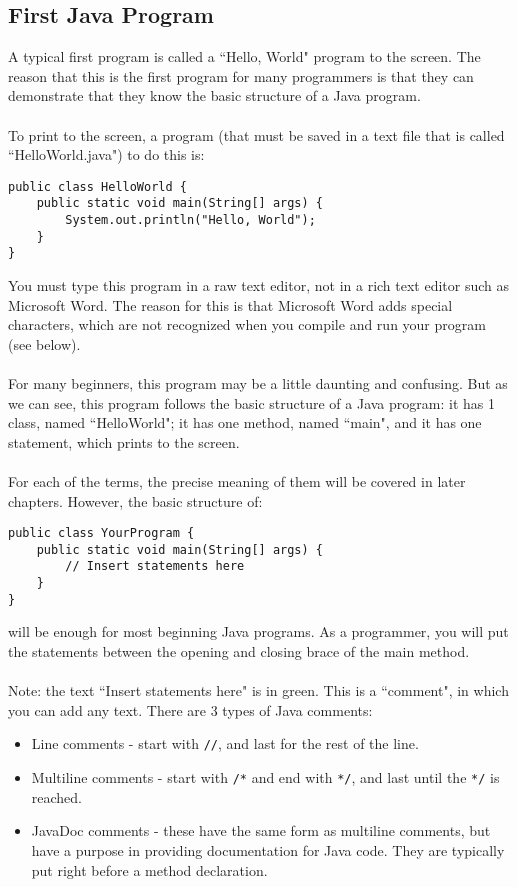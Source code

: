 \subsection{First Java Program}
A typical first program is called a ``Hello, World" program to the screen. The reason that this is the first program for many programmers is that they can demonstrate that they know the basic structure of a Java program. 
\\ \\
To print to the screen, a program (that must be saved in a text file that is called ``HelloWorld.java") to do this is:
\begin{lstlisting}
public class HelloWorld {
	public static void main(String[] args) {
		System.out.println("Hello, World");
	}
}
\end{lstlisting}
You must type this program in a raw text editor, not in a rich text editor such as Microsoft Word. The reason for this is that Microsoft Word adds special characters, which are not recognized when you compile and run your program (see below).
\\ \\
For many beginners, this program may be a little daunting and confusing. But as we can see, this program follows the basic structure of a Java program: it has 1 class, named ``HelloWorld"; it has one method, named ``main", and it has one statement, which prints to the screen. 
\\ \\
For each of the terms, the precise meaning of them will be covered in later chapters. However, the basic structure of:
\begin{lstlisting}
public class YourProgram {
	public static void main(String[] args) {
		// Insert statements here
	}
}
\end{lstlisting}
will be enough for most beginning Java programs. As a programmer, you will put the statements between the opening and closing brace of the main method.
\\ \\
Note: the text ``Insert statements here" is in green. This is a ``comment", in which you can add any text. There are 3 types of Java comments:

\begin{itemize}
\item Line comments - start with \verb|//|, and last for the rest of the line.
\item Multiline comments - start with \verb|/*| and end with \verb|*/|, and last until the \verb|*/| is reached.
\item JavaDoc comments - these have the same form as multiline comments, but have a purpose in providing documentation for Java code. They are typically put right before a method declaration.
\end{itemize}

